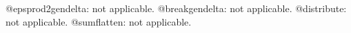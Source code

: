 \documentclass[11pt]{article}
\begin{document}
@epsprod2gendelta: not applicable.
@breakgendelta: not applicable.
@distribute: not applicable.
@sumflatten: not applicable.
\end{document}
